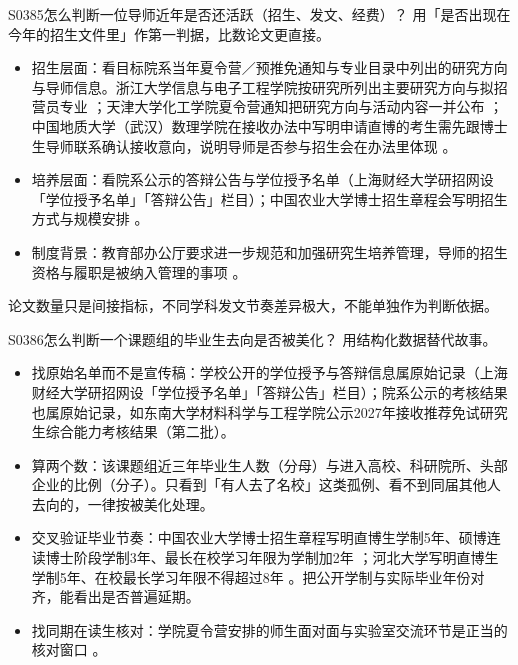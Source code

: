 \begin{qa}{S0385}{怎么判断一位导师近年是否还活跃（招生、发文、经费）？}
用「是否出现在今年的招生文件里」作第一判据，比数论文更直接。
\begin{itemize}
  \item 招生层面：看目标院系当年夏令营／预推免通知与专业目录中列出的研究方向与导师信息。浙江大学信息与电子工程学院按研究所列出主要研究方向与拟招营员专业 ；天津大学化工学院夏令营通知把研究方向与活动内容一并公布 ；中国地质大学（武汉）数理学院在接收办法中写明申请直博的考生需先跟博士生导师联系确认接收意向，说明导师是否参与招生会在办法里体现 。
  \item 培养层面：看院系公示的答辩公告与学位授予名单（上海财经大学研招网设「学位授予名单」「答辩公告」栏目）；中国农业大学博士招生章程会写明招生方式与规模安排 。
  \item 制度背景：教育部办公厅要求进一步规范和加强研究生培养管理，导师的招生资格与履职是被纳入管理的事项 。
\end{itemize}
论文数量只是间接指标，不同学科发文节奏差异极大，不能单独作为判断依据。
\end{qa}

\begin{qa}{S0386}{怎么判断一个课题组的毕业生去向是否被美化？}
用结构化数据替代故事。
\begin{itemize}
  \item 找原始名单而不是宣传稿：学校公开的学位授予与答辩信息属原始记录（上海财经大学研招网设「学位授予名单」「答辩公告」栏目）；院系公示的考核结果也属原始记录，如东南大学材料科学与工程学院公示2027年接收推荐免试研究生综合能力考核结果（第二批）。
  \item 算两个数：该课题组近三年毕业生人数（分母）与进入高校、科研院所、头部企业的比例（分子）。只看到「有人去了名校」这类孤例、看不到同届其他人去向的，一律按被美化处理。
  \item 交叉验证毕业节奏：中国农业大学博士招生章程写明直博生学制5年、硕博连读博士阶段学制3年、最长在校学习年限为学制加2年 ；河北大学写明直博生学制5年、在校最长学习年限不得超过8年 。把公开学制与实际毕业年份对齐，能看出是否普遍延期。
  \item 找同期在读生核对：学院夏令营安排的师生面对面与实验室交流环节是正当的核对窗口 。
\end{itemize}
\end{qa}

